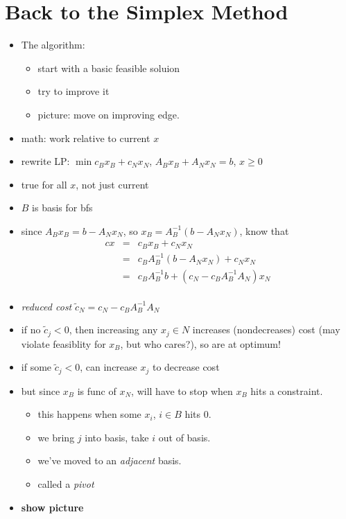 \documentclass{article}
\begin{document}
\section{Back to the Simplex Method}
\begin{itemize}
	\item The algorithm:
\begin{itemize}
	\item start with a basic feasible soluion 
	\item try to improve it
	\item picture: move on improving edge.  
\end{itemize}
	\item math: work relative to current $x$
	\item rewrite LP: $\min c_Bx_B + c_N x_N$, $A_Bx_B+A_N x_N=b$, $x \ge 0$
	\item true for all $x$, not just current
	\item $B$ is basis for bfs
	\item since $A_Bx_B = b-A_Nx_N$, so $x_B = A_B^{-1}(b-A_Nx_N)$, know that
	\begin{eqnarray*}
		cx &= &c_Bx_B+c_Nx_N\\
		&= & c_B A_B^{-1}(b-A_Nx_N) + c_N x_N\\
		&= & c_B A_B^{-1} b + (c_N-c_BA_B^{-1}A_N)x_N\\
	\end{eqnarray*}
	\item {\em reduced cost} $\tilde c_N = c_N-c_BA_B^{-1}A_N$
	\item if no $\tilde c_j < 0$, then increasing any $x_j \in N$
	increases (nondecreases) cost
	(may violate feasiblity for $x_B$, but who cares?), so are at
	optimum!
	\item if some $\tilde c_j < 0$, can increase $x_j$ to decrease cost
	\item but since $x_B$ is func of $x_N$, will have to stop when $x_B$
	hits a constraint.
	\begin{itemize}
		\item this happens when some $x_i$, $i \in B$ hits 0.
		\item we bring $j$ into basis, take $i$ out of basis.
		\item we've moved to an {\em adjacent} basis.
		\item called a {\em pivot}
	\end{itemize}
	\item {\bf show picture}
\end{itemize}
\end{document}
